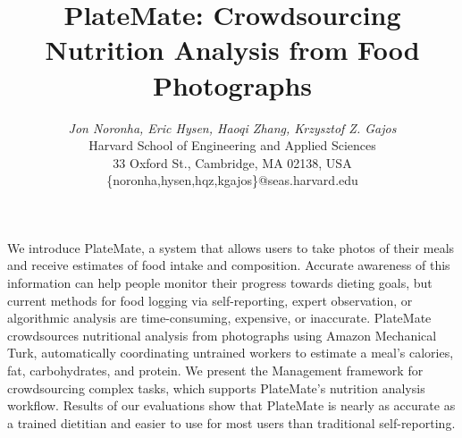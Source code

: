 \documentclass{article}
\begin{document}


%

\title{PlateMate: Crowdsourcing Nutrition Analysis from Food Photographs}


\author{
\parbox[t]{12cm}{\centering
	     {\em Jon Noronha, Eric Hysen, Haoqi Zhang, Krzysztof Z. Gajos}\\
	     Harvard School of Engineering and Applied Sciences\\
	   	33 Oxford St.,
	     Cambridge, MA 02138, USA\\
	     \{noronha,hysen,hqz,kgajos\}@seas.harvard.edu}
}


\maketitle



\abstract We introduce PlateMate, a system that allows users to take photos of their meals and
receive estimates of food intake and composition. Accurate awareness
of this information can help people monitor their progress towards  
 dieting goals, but current
methods for food logging via self-reporting, expert observation, or
algorithmic analysis are time-consuming, expensive, or inaccurate.
PlateMate crowdsources nutritional analysis from photographs using
Amazon Mechanical Turk, automatically coordinating untrained workers
to estimate a meal's calories, fat, carbohydrates, and protein.  We
present the Management framework for crowdsourcing complex tasks,
which supports PlateMate's nutrition analysis workflow. Results of our evaluations
show that PlateMate is nearly as accurate as a trained
dietitian and easier to use for most users than traditional
self-reporting.
\end{document}
